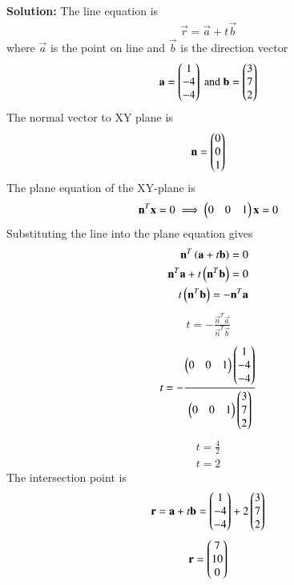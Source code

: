 \documentclass[journal]{IEEEtran}
\begin{document}
\textbf{Solution:}  
The line equation is  
\begin{align}
\vec{r} = \vec{a} + t \vec{b}
\end{align}
where $\vec{a}$ is the point on line and $\vec{b}$ is the direction vector
\begin{align}
\mathbf{a} = \begin{pmatrix}1 \\ -4 \\ -4\end{pmatrix}\ \text{and}\
\mathbf{b} = \begin{pmatrix}3 \\ 7 \\ 2\end{pmatrix}
\end{align}
The normal vector to XY plane is
\begin{align}
\mathbf{n} = \begin{pmatrix}0 \\ 0 \\ 1\end{pmatrix}
\end{align}
The plane equation of the XY-plane is  
\begin{align}
\mathbf{n}^T \mathbf{x} = 0 \implies \begin{pmatrix}0 & 0 & 1\end{pmatrix}\mathbf{x}=0
\end{align}
Substituting the line into the plane equation gives  
\begin{align}
\mathbf{n}^T\left( \mathbf{a} + t\mathbf{b}\right) = 0  \\
\mathbf{n}^T \mathbf{a} + t\left(\mathbf{n}^T \mathbf{b}\right) = 0 \\
t\left(\mathbf{n}^T \mathbf{b}\right)=-\mathbf{n}^T \mathbf{a} 
\end{align}
\begin{align}
t =-\frac{\vec{n}^T \vec{a}}{\vec{n}^T \vec{b}}
\end{align}
\begin{align}
t =-\frac{\begin{pmatrix}0 & 0 & 1\end{pmatrix}\begin{pmatrix}1 \\ -4 \\ -4\end{pmatrix}}{\begin{pmatrix}0 & 0 & 1\end{pmatrix}\begin{pmatrix}3 \\ 7 \\ 2\end{pmatrix}} 
\end{align}
\begin{align}
t=\frac{4}{2}\\
t=2
\end{align}
The intersection point is  
\begin{align}
\mathbf{r} = \mathbf{a} + t\mathbf{b} 
= \begin{pmatrix}1 \\ -4 \\ -4\end{pmatrix} + 2\begin{pmatrix}3 \\ 7 \\ 2\end{pmatrix}
\end{align} 
\begin{align}
\mathbf{r} = \begin{pmatrix}7 \\ 10 \\ 0\end{pmatrix}
\end{align}
\end{document}
